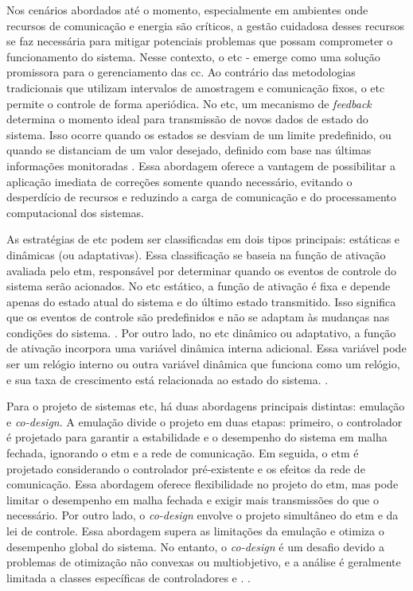Nos cenários abordados até o momento, especialmente em ambientes onde recursos de comunicação e energia são críticos, a gestão cuidadosa desses recursos se faz necessária para mitigar potenciais problemas que possam comprometer o funcionamento do sistema. Nesse contexto, o \acrfull{etc} - emerge como uma solução promissora para o gerenciamento das  \acrshort{cc}. Ao contrário das metodologias tradicionais que utilizam intervalos de amostragem e comunicação fixos, o \acrshort{etc} permite o controle de forma aperiódica. No \acrshort{etc}, um mecanismo de \textit{feedback} determina o momento ideal para transmissão de novos dados de estado do sistema. Isso ocorre quando os estados se desviam de um limite predefinido, ou quando se distanciam de um valor desejado, definido com base nas últimas informações monitoradas \citep{coutinho2021}. Essa abordagem oferece a vantagem de possibilitar a aplicação imediata de correções somente quando necessário, evitando o desperdício de recursos e reduzindo a carga de comunicação e do processamento computacional dos sistemas.

As estratégias de \acrshort{etc} podem ser classificadas em dois tipos principais: estáticas e dinâmicas (ou adaptativas). Essa classificação se baseia na função de ativação avaliada pelo \acrshort{etm}, responsável por determinar quando os eventos de controle do sistema serão acionados. No \acrshort{etc} estático, a função de ativação é fixa e depende apenas do estado atual do sistema e do último estado transmitido. Isso significa que os eventos de controle são predefinidos e não se adaptam às mudanças nas condições do sistema. \citep{coutinho2021}. Por outro lado, no \acrshort{etc} dinâmico ou adaptativo, a função de ativação incorpora uma variável dinâmica interna adicional. Essa variável pode ser um relógio interno ou outra variável dinâmica que funciona como um relógio, e sua taxa de crescimento está relacionada ao estado do sistema. \citep{Girard2015}.

Para o projeto de sistemas \acrshort{etc}, há duas abordagens principais distintas: emulação e \textit{co-design}. A emulação divide o projeto em duas etapas: primeiro, o controlador é projetado para garantir a estabilidade e o desempenho do sistema em malha fechada, ignorando o \acrshort{etm} e a rede de comunicação. Em seguida, o \acrshort{etm} é projetado considerando o controlador pré-existente e os efeitos da rede de comunicação. Essa abordagem oferece flexibilidade no projeto do \acrshort{etm}, mas pode limitar o desempenho em malha fechada e exigir mais transmissões do que o necessário. Por outro lado, o \textit{co-design} envolve o projeto simultâneo do \acrshort{etm} e da lei de controle. Essa abordagem supera as limitações da emulação e otimiza o desempenho global do sistema. No entanto, o \textit{co-design} é um desafio devido a problemas de otimização não convexas ou multiobjetivo, e a análise é geralmente limitada a classes específicas de controladores e . \citep{coutinho2021}.


